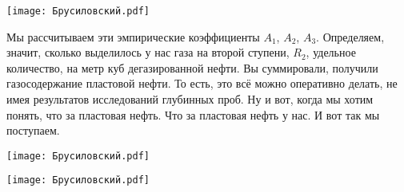 \documentclass[main.tex]{subfiles}
\begin{document}
\begin{center}
\texttt{[image: Брусиловский.pdf]}
\end{center}

Мы рассчитываем эти эмпирические коэффициенты $A_1$, $A_2$, $A_3$.
Определяем, значит, сколько выделилось у нас газа на второй ступени, $R_2$, удельное количество, на метр куб дегазированной нефти.
Вы суммировали, получили газосодержание пластовой нефти.
То есть, это всё можно оперативно делать, не имея результатов исследований глубинных проб.
Ну и вот, когда мы хотим понять, что за пластовая нефть.
Что за пластовая нефть у нас.
И вот так мы поступаем.

\begin{center}
\texttt{[image: Брусиловский.pdf]}
\end{center}

\begin{center}
\texttt{[image: Брусиловский.pdf]}
\end{center}
\end{document}
